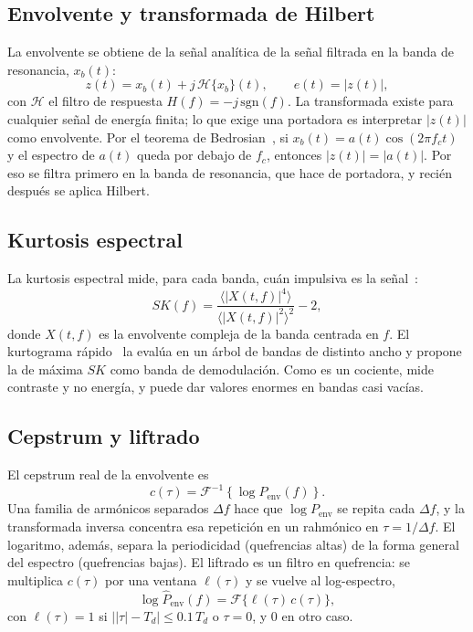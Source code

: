 \documentclass[conference,a4paper]{IEEEtran}
\begin{document}
\subsection{Envolvente y transformada de Hilbert}
La envolvente se obtiene de la señal analítica de la señal filtrada en la banda de resonancia, $x_b(t)$:
\begin{equation}
z(t)=x_b(t)+j\,\mathcal{H}\{x_b\}(t),\qquad e(t)=|z(t)|,
\end{equation}
con $\mathcal{H}$ el filtro de respuesta $H(f)=-j\,\mathrm{sgn}(f)$. La transformada existe para cualquier señal de energía finita; lo que exige una portadora es interpretar $|z(t)|$ como envolvente. Por el teorema de Bedrosian~\cite{bedrosian1963}, si $x_b(t)=a(t)\cos(2\pi f_c t)$ y el espectro de $a(t)$ queda por debajo de $f_c$, entonces $|z(t)|=|a(t)|$. Por eso se filtra primero en la banda de resonancia, que hace de portadora, y recién después se aplica Hilbert.

\subsection{Kurtosis espectral}
La kurtosis espectral mide, para cada banda, cuán impulsiva es la señal~\cite{antoni2006}:
\begin{equation}
SK(f)=\frac{\langle|X(t,f)|^4\rangle}{\langle|X(t,f)|^2\rangle^2}-2,
\end{equation}
donde $X(t,f)$ es la envolvente compleja de la banda centrada en $f$. El kurtograma rápido~\cite{antoni2007} la evalúa en un árbol de bandas de distinto ancho y propone la de máxima $SK$ como banda de demodulación. Como es un cociente, mide contraste y no energía, y puede dar valores enormes en bandas casi vacías.

\subsection{Cepstrum y liftrado}
El cepstrum real de la envolvente es~\cite{bogert1963,oppenheim2010}
\begin{equation}
c(\tau)=\mathcal{F}^{-1}\left\{\log P_{\mathrm{env}}(f)\right\}.
\end{equation}
Una familia de armónicos separados $\Delta f$ hace que $\log P_{\mathrm{env}}$ se repita cada $\Delta f$, y la transformada inversa concentra esa repetición en un rahmónico en $\tau=1/\Delta f$. El logaritmo, además, separa la periodicidad (quefrencias altas) de la forma general del espectro (quefrencias bajas). El liftrado es un filtro en quefrencia: se multiplica $c(\tau)$ por una ventana $\ell(\tau)$ y se vuelve al log-espectro,
\begin{equation}
\log\hat P_{\mathrm{env}}(f)=\mathcal{F}\{\ell(\tau)\,c(\tau)\},
\end{equation}
con $\ell(\tau)=1$ si $\big||\tau|-T_d\big|\le 0.1\,T_d$ o $\tau=0$, y $0$ en otro caso.
\end{document}
